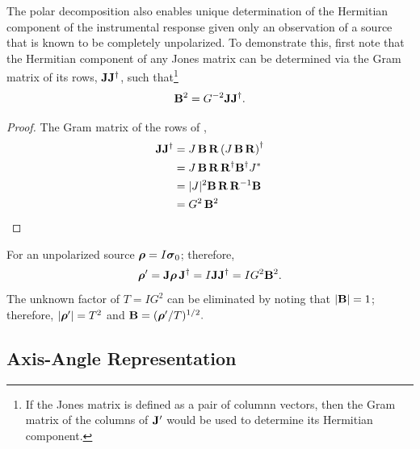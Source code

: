 The polar decomposition
%
also enables unique determination of the Hermitian component of the instrumental response given only an observation of a source that is known to be completely unpolarized.
%
To demonstrate this, first note that the Hermitian component of any Jones matrix 
%
can be determined via the Gram matrix of its rows,  
${\bf J}{\bf J}^\dagger$, such that\footnote{
If the Jones matrix is defined as a pair of columnn vectors, then the
Gram matrix of the columns of ${\bf J}'$ would be used to determine its Hermitian component. }
%
\begin{equation}
\label{eqn:boost_from_polar}
{\bf B}^2 = G^{-2} {\bf J}{\bf J}^\dagger.
\end{equation}
%
\begin{proof}
\label{proof:self_adjoint_square}
The Gram matrix of the rows of ,
\begin{align*}
{\bf J}{\bf J}^\dagger
& = J \, {\bf B} \, {\bf R} \left( J \, {\bf B} \, {\bf R} \right)^\dagger \\
& = J \, {\bf B} \, {\bf R} \, {\bf R}^\dagger {\bf B}^\dagger J^* \\
& = |J|^2 {\bf B} \, {\bf R} \, {\bf R}^{-1} {\bf B} \\
& = G^2 \, {\bf B}^2
\end{align*}
\noindent
\end{proof}
%
\noindent
For an unpolarized source $\mbox{\boldmath $\rho$} = I\mbox{\boldmath $\sigma$}_{0}$; therefore,
%
\begin{equation}
\mbox{\boldmath $\rho$}' = {\bf J} \mbox{\boldmath $\rho$} \, {\bf J}^\dagger = I {\bf J}{\bf J}^\dagger = I G^2 {\bf B}^2.
\end{equation}
The unknown factor of $T=IG^2$ can be eliminated by noting that $|{\bf B}|=1$;
therefore, $|\mbox{\boldmath $\rho$}'| = T^2$
and ${\bf B}= ({\mbox{\boldmath $\rho$}}'/T)^{1/2}.$



\subsection{Axis-Angle Representation}
\label{sec:axis-angle}


